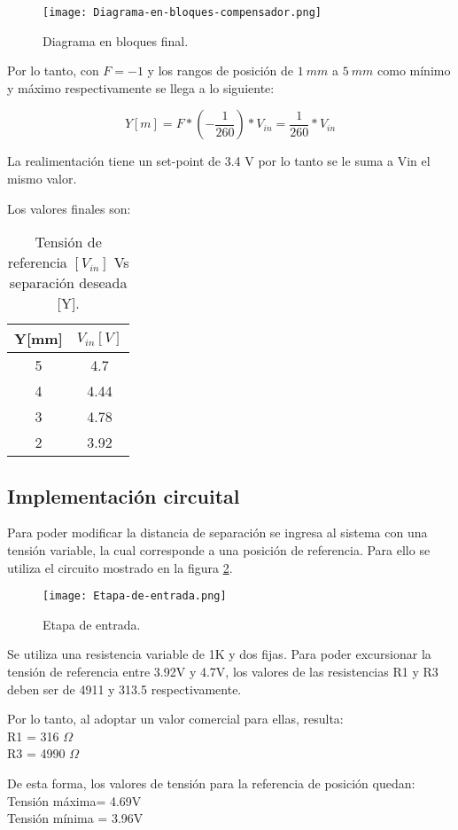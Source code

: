 \begin{figure}[H]
	\centering
	\texttt{[image: Diagrama-en-bloques-compensador.png]}
	\caption{Diagrama en bloques final.}
	\label{fig:diag-bloques-compensador}
\end{figure}

\noindent Por lo tanto, con $F=-1$ y los rangos de posición de $1\:mm$ a $5\:mm$ como mínimo y máximo respectivamente se llega a lo siguiente:

\begin{equation} 
	Y[m] = F * (-\frac{1}{260})*V_{in} =\frac{1}{260}*V_{in} 
\end{equation}

\noindent La realimentación tiene un set-point de 3.4 V por lo tanto se le suma a Vin el mismo valor.

\noindent Los valores finales son:


\begin{table}[H]
	\begin{center}
		\begin{tabular}{| c | c |}
			\hline
			Y[mm] & $V_{in}[V]$\\ \hline
			5 & 4.7\\ \hline
			4 & 4.44 \\ \hline
			3 & 4.78\\ \hline
			2 &	3.92 \\ \hline		
		\end{tabular}
		\caption{Tensión de referencia $[V_{in}]$ Vs separación deseada [Y].}
		\label{tension-ref-vs-separacion-deseada}
	\end{center}
\end{table}

\subsection{Implementación circuital}

\noindent Para poder modificar la distancia de separación se ingresa al sistema con una tensión variable, la cual corresponde a una posición de referencia. Para ello se utiliza el circuito mostrado en la figura \ref{fig:etapa-de-entrada}.

\begin{figure}[H]
	\centering
	\texttt{[image: Etapa-de-entrada.png]}
	\caption{ Etapa de entrada.}
	\label{fig:etapa-de-entrada}
\end{figure}

 
 \noindent Se utiliza una resistencia variable de 1K y dos fijas. Para poder excursionar la tensión de referencia entre 3.92V y 4.7V, los valores de las resistencias R1 y R3 deben ser de 4911 y 313.5 respectivamente. 
 
\noindent Por lo tanto, al adoptar un valor comercial para ellas, resulta:\\
\noindent R1 = 316 $\Omega$\\
\noindent R3 = 4990 $\Omega$
 
\noindent De esta forma, los valores de tensión para la referencia de posición quedan:\\
\noindent Tensión máxima= 4.69V\\
\noindent Tensión mínima = 3.96V
 

